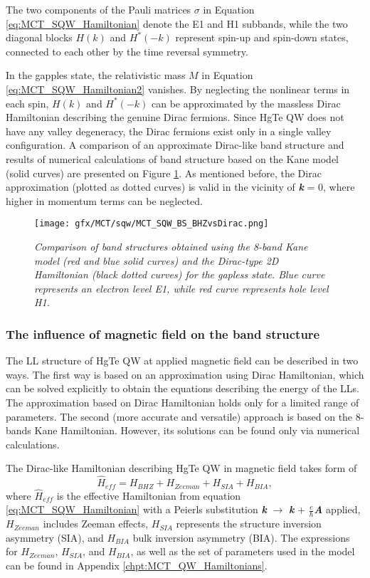 \documentclass[titlepage,a4paper]{book}
\newcommand{\wciecie}{\quad\phantom{v}}
\begin{document}
The two components of the Pauli matrices $\sigma$ in Equation \ref{eq:MCT_SQW_Hamiltonian} denote the E1 and H1 subbands, while the two diagonal blocks $H(k)$ and $H^*(-k)$ represent spin-up and spin-down states, connected to each other by the time reversal symmetry. 

In the gapples state, the relativistic mass $M$ in Equation \ref{eq:MCT_SQW_Hamiltonian2} vanishes. By neglecting the nonlinear terms in each spin, $H(k)$ and $H^*(-k)$ can be approximated by the massless Dirac Hamiltonian describing the genuine Dirac fermions. Since HgTe QW does not have any valley degeneracy, the Dirac fermions exist only in a single valley configuration. A comparison of an approximate Dirac-like band structure and results of numerical calculations of band structure based on the Kane model (solid curves) are presented on Figure \ref{fig:MCT_SQW_BS_BHZvsDirac}. As mentioned before, the Dirac approximation (plotted as dotted curves) is valid in the vicinity of \textbf{\textit{k}} = 0, where higher in momentum terms can be neglected.  

\begin{figure}[H]
	\centering
	\texttt{[image: gfx/MCT/sqw/MCT\_SQW\_BS\_BHZvsDirac.png]}
	\vspace{-10pt}
	\caption{\textit{Comparison of band structures obtained using the 8-band Kane model (red and blue solid curves) and the Dirac-type 2D Hamiltonian (black dotted curves) for the gapless state. Blue curve represents an electron level E1, while red curve represents hole level H1.}}
	\label{fig:MCT_SQW_BS_BHZvsDirac}
\end{figure} 

\subsubsection{The influence of magnetic field on the band structure}
\wciecie
The LL structure of HgTe QW at applied magnetic field can be described in two ways. The first way is based on an approximation using Dirac Hamiltonian, which can be solved explicitly to obtain the equations describing the energy of the LLs. The approximation based on Dirac Hamiltonian holds only for a limited range of parameters. The second (more accurate and versatile) approach is based on the 8-bands Kane Hamiltonian. However, its solutions can be found only via numerical calculations.

The Dirac-like Hamiltonian describing HgTe QW in magnetic field takes form of
\begin{equation}
\label{eq:MCT_SQW_MagneticField}
\hat H_{eff} = H_{BHZ} + H_{Zeeman} + H_{SIA} + H_{BIA} ,
\end{equation}
where $\hat{H}_{eff}$ is the effective Hamiltonian from equation \ref{eq:MCT_SQW_Hamiltonian} with a Peierls substitution \textbf{\textit{k}} $\rightarrow$ \textbf{\textit{k}} + $\frac{e}{\hbar}$\textbf{\textit{A}} applied, $H_{Zeeman}$ includes Zeeman effects, $H_{SIA}$ represents the structure inversion asymmetry (SIA), and $H_{BIA}$ bulk inversion asymmetry (BIA). The expressions for $H_{Zeeman}$, $H_{SIA}$, and $H_{BIA}$, as well as the set of parameters used in the model can be found in Appendix \ref{chpt:MCT_QW_Hamiltonians}.
\end{document}
